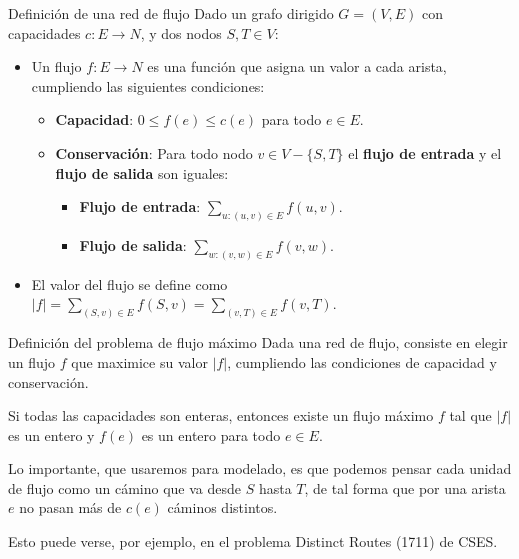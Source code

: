 \documentclass{beamer}
\begin{document}
\begin{frame}{Definición de una red de flujo}
    Dado un grafo dirigido $G = (V, E)$ con capacidades $c: E \to N$, y dos nodos $S, T \in V$:
    \begin{itemize}
        \item Un flujo $f: E \to N$ es una función que asigna un valor a cada arista, cumpliendo las siguientes condiciones:
        \begin{itemize}
            \item \textbf{Capacidad}: $0 \leq f(e) \leq c(e)$ para todo $e \in E$.
            \item \textbf{Conservación}: Para todo nodo $v \in V - \{S, T\}$ el \textbf{flujo de entrada} y el \textbf{flujo de salida} son iguales:
            \begin{itemize}
                \item \textbf{Flujo de entrada}: $\sum_{u: (u,v) \in E} f(u,v)$.
                \item \textbf{Flujo de salida}: $\sum_{w: (v,w) \in E} f(v,w)$.
            \end{itemize}
        \end{itemize}
        \pause
        \item El valor del flujo se define como $|f| = \sum_{(S,v) \in E} f(S,v) = \sum_{(v,T) \in E} f(v,T)$.
    \end{itemize}
\end{frame}

\begin{frame}{Definición del problema de flujo máximo}
    Dada una red de flujo, consiste en elegir un flujo $f$ que maximice su valor $|f|$, cumpliendo las condiciones de capacidad y conservación.
    
    \begin{Theorem}
        Si todas las capacidades son enteras, entonces existe un flujo máximo $f$ tal que $|f|$ es un entero y $f(e)$ es un entero para todo $e \in E$.
    \end{Theorem}

    \pause

    Lo importante, que usaremos para modelado, es que podemos pensar cada unidad de flujo como un cámino que va desde $S$ hasta $T$, de tal forma que por una arista $e$ no pasan más de $c(e)$ cáminos distintos.

    Esto puede verse, por ejemplo, en el problema Distinct Routes (1711) de CSES.
\end{frame}
\end{document}
